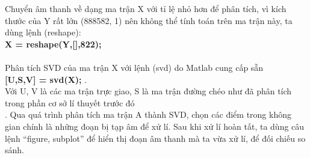 Chuyển âm thanh về dạng ma trận X với tỉ lệ nhỏ hơn để phân tích, vì kích thước của Y rất lớn (888582, 1) nên không thể tính toán trên ma trận này, ta dùng lệnh (reshape):\\
\textbf{
	X = reshape(Y,[\hspace{0.2cm}],822);\\
}
\\
Phân tích SVD của ma trận X với lệnh (svd) do Matlab cung cấp sẵn\\
\textbf{
	[U,S,V] = svd(X);
}.\\
Với U, V là các ma trận trực giao, S là ma trận đường chéo như đã phân tích trong phần cơ sở lí thuyết trước đó\\
. Qua quá trình phân tích ma trận A thành SVD, chọn các điểm trong không gian chính là những đoạn bị tạp âm để xử lí. Sau khi xử lí hoàn tất, ta dùng câu lệnh “figure, subplot” để hiển thị đoạn âm thanh mà ta vừa xử lí, để đối chiếu so sánh. \\

